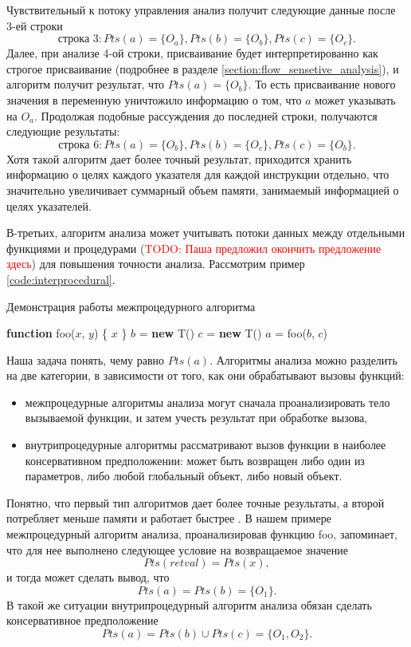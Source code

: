 \documentclass[14pt,titlepage]{extarticle}
\newcommand{\NEW}{\textbf{new }}
\newcommand{\FUNCTION}{\textbf{function }}
\newcommand{\todo}[1]{\textcolor{red}{\eng{TODO}: #1}}
\newcommand{\eng}[1]{{\English#1}}
\begin{document}
      Чувствительный к потоку управления анализ получит следующие данные после
      3-ей строки
      \[\textrm{строка 3}:
          Pts(a) = \{O_a\}, Pts(b) = \{O_b\}, Pts(c) = \{O_c\}.\]
      Далее, при анализе 4-ой строки, присваивание будет интерпретированно как
      строгое присваивание (подробнее в разделе
      \ref{section:flow_sensetive_analysis}), и алгоритм получит
      результат, что $Pts(a) = \{O_b\}$. То есть присваивание нового значения
      в переменную уничтожило информацию о том, что $a$ может указывать на $O_a$.
      Продолжая подобные рассуждения до последней строки, получаются следующие
      результаты:
      \[\textrm{строка 6}:
          Pts(a) = \{O_b\}, Pts(b) = \{O_c\}, Pts(c) = \{O_b\}.\]
      Хотя такой алгоритм дает более точный результат, приходится хранить
      информацию о целях каждого указателя для каждой инструкции отдельно,
      что значительно увеличивает суммарный объем памяти, занимаемый
      информацией о целях указателей.

      В-третьих, алгоритм анализа может учитывать потоки данных между отдельными
      функциями и процедурами
      (\todo{Паша предложил окончить предложение здесь})
      для повышения точности анализа.
      Рассмотрим пример \ref{code:interprocedural}.
      \begin{algorithm}
        \caption{Демонстрация работы межпроцедурного алгоритма}
        \label{code:interprocedural}
        \begin{algorithmic}[1]
          \STATE \FUNCTION foo($x$, $y$) \{
          \RETURN $x$
          \STATE \}
          \STATE
          \STATE $b$ = \NEW T()
          \STATE $c$ = \NEW T()
          \STATE $a$ = foo($b$, $c$)
        \end{algorithmic}
      \end{algorithm}

      Наша задача понять, чему равно $Pts(a)$.
      Алгоритмы анализа можно разделить на две категории, в зависимости от того,
      как они обрабатывают вызовы функций:
      \begin{itemize}
        \item межпроцедурные алгоритмы анализа могут сначала проанализировать
              тело вызываемой функции, и затем учесть результат при обработке
              вызова,
        \item внутрипроцедурные алгоритмы рассматривают вызов функции в наиболее
              консервативном предположении: может быть возвращен либо один из
              параметров, либо любой глобальный объект, либо новый объект.
      \end{itemize}
      Понятно, что первый тип алгоритмов дает более точные результаты,
      а второй потребляет меньше памяти и работает быстрее
      \cite[с.~117]{andersen}.
      В нашем примере межпроцедурный алгоритм анализа, проанализировав функцию
      foo, запоминает, что для нее выполнено следующее условие на возвращаемое
      значение
      \[Pts(retval) = Pts(x),\]
      и тогда может сделать вывод, что \[Pts(a) = Pts(b) = \{O_1\}.\]
      В такой же ситуации внутрипроцедурный алгоритм анализа обязан сделать
      консервативное предположение
      \[Pts(a) = Pts(b) \cup Pts(c) = \{O_1, O_2\}.\]
\end{document}
